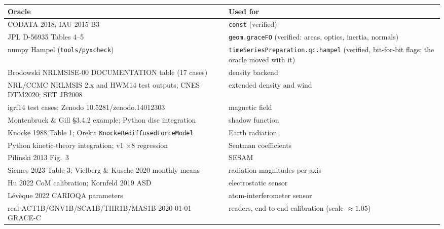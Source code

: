 \begin{table}[h]\centering\footnotesize
\begin{tabular}{@{}p{9.6cm}p{6cm}@{}}\toprule
Oracle & Used for\\\midrule
CODATA 2018, IAU 2015 B3 & \texttt{const} (verified)\\
JPL D-56935 Tables 4--5 & \texttt{geom.graceFO} (verified: areas, optics, inertia, normals)\\
numpy Hampel (\texttt{tools/pyxcheck}) & \texttt{timeSeriesPreparation.qc.hampel} (verified, bit-for-bit flags; the oracle moved with it)\\
Brodowski NRLMSISE-00 DOCUMENTATION table (17 cases) & density backend\\
NRL/CCMC NRLMSIS 2.x and HWM14 test outputs; CNES DTM2020; SET JB2008 & extended density and wind\\
igrf14 test cases; Zenodo 10.5281/zenodo.14012303 & magnetic field\\
Montenbruck \& Gill \S3.4.2 example; Python disc integration & shadow function\\
Knocke 1988 Table 1; Orekit \texttt{KnockeRediffusedForceModel} & Earth radiation\\
Python kinetic-theory integration; v1 $\times8$ regression & Sentman coefficients\\
Pilinski 2013 Fig.~3 & SESAM\\
Siemes 2023 Table 3; Vielberg \& Kusche 2020 monthly means & radiation magnitudes per axis\\
Hu 2022 CoM calibration; Kornfeld 2019 ASD & electrostatic sensor\\
Lévèque 2022 CARIOQA parameters & atom-interferometer sensor\\
real ACT1B/GNV1B/SCA1B/THR1B/MAS1B 2020-01-01 GRACE-C & readers, end-to-end calibration (scale $\approx1.05$)\\\bottomrule
\end{tabular}
\end{table}
